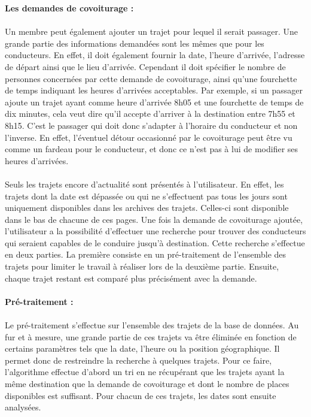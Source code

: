 \documentclass[12pt, a4paper, oneside]{article}
\begin{document}
{{    \textbf{Les demandes de covoiturage :}\\\\
    \indent Un membre peut également ajouter un trajet pour lequel il serait passager. Une grande partie des informations demandées sont les mêmes que pour les conducteurs. En effet, il doit également fournir la date, l'heure d'arrivée, l'adresse de départ ainsi que le lieu d'arrivée. Cependant il doit spécifier le nombre de personnes concernées par cette demande de covoiturage, ainsi qu'une fourchette de temps indiquant les heures d'arrivées acceptables. Par exemple, si un passager ajoute un trajet ayant comme heure d'arrivée 8h05 et une fourchette de temps de dix minutes, cela veut dire qu'il accepte d'arriver à la destination entre 7h55 et 8h15. C'est le passager qui doit donc s'adapter à l'horaire du conducteur et non l'inverse. En effet, l'éventuel détour occasionné par le covoiturage peut être vu comme un fardeau pour le conducteur, et donc ce n'est pas à lui de modifier ses heures d'arrivées.\\\\
    \indent Seuls les trajets encore d'actualité sont présentés à l'utilisateur. En effet, les trajets dont la date est dépassée ou qui ne s'effectuent pas tous les jours sont uniquement disponibles dans les archives des trajets. Celles-ci sont disponible dans le bas de chacune de ces pages. Une fois la demande de covoiturage ajoutée, l'utilisateur a la possibilité d'effectuer une recherche pour trouver des conducteurs qui seraient capables de le conduire jusqu'à destination. Cette recherche s'effectue en deux parties. La première consiste en un pré-traitement de l'ensemble des trajets pour limiter le travail à réaliser lors de la deuxième partie. Ensuite, chaque trajet restant est comparé plus précisément avec la demande.\\\\
    \textbf{Pré-traitement :}\\\\
     \indent Le pré-traitement s'effectue sur l'ensemble des trajets de la base de données. Au fur et à mesure, une grande partie de ces trajets va être éliminée en fonction de certains paramètres tels que la date, l'heure ou la position géographique. Il permet donc de restreindre la recherche à quelques trajets. Pour ce faire, l'algorithme effectue d'abord un tri en ne récupérant que les trajets ayant la même destination que la demande de covoiturage et dont le nombre de places disponibles est suffisant. Pour chacun de ces trajets, les dates sont ensuite analysées.\\
}}
\end{document}
